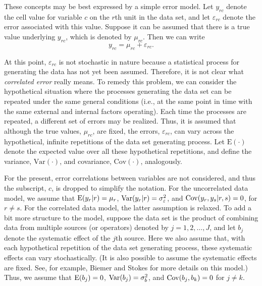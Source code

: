 \documentclass[]{krantz}
\begin{document}
These concepts may be best expressed by a simple error model. Let
\(y_{rc}\) denote the cell value for variable \(c\) on the \(r\)th unit
in the data set, and let \(\varepsilon_{rc}\) denote the error
associated with this value. Suppose it can be assumed that there is a
true value underlying \(y_{rc}\), which is denoted by \(\mu_{rc}\). Then
we can write \[\label{eq:10-1.1}
y_{rc} = \mu_{rc} + \varepsilon_{rc}.\]

At this point, \(\varepsilon_{rc}\) is not stochastic in nature because
a statistical process for generating the data has not yet been assumed.
Therefore, it is not clear what \emph{correlated error} really means. To
remedy this problem, we can consider the hypothetical situation where
the processes generating the data set can be repeated under the same
general conditions (i.e., at the same point in time with the same
external and internal factors operating). Each time the processes are
repeated, a different set of errors may be realized. Thus, it is assumed
that although the true values, \(\mu_{rc}\), are fixed, the errors,
\(\varepsilon_{rc}\), can vary across the hypothetical, infinite
repetitions of the data set generating process. Let \(\mbox{E}(\cdot)\)
denote the expected value over all these hypothetical repetitions, and
define the variance, \(\mathrm{Var}(\cdot)\), and covariance,
\(\mathrm{Cov}(\cdot)\), analogously.

For the present, error correlations between variables are not
considered, and thus the subscript, \(c\), is dropped to simplify the
notation. For the uncorrelated data model, we assume that
\({\rm E}(y_r \vert r) = \mu_r\),
\({\rm Var}(y_r \vert r) = \sigma_\varepsilon^2\), and
\({\rm Cov}(y_r ,y_s \vert r,s) = 0\), for \(r \ne s\). For the
correlated data model, the latter assumption is relaxed. To add a bit
more structure to the model, suppose the data set is the product of
combining data from multiple sources (or operators) denoted by
\(j = 1, 2, \ldots, J\), and let \(b_j\) denote the systematic effect of
the \(j\)th source. Here we also assume that, with each hypothetical
repetition of the data set generating process, these systematic effects
can vary stochastically. (It is also possible to assume the systematic
effects are fixed. See, for example, Biemer and Stokes
\citeyearpar{BiemerStokes1991} for more details on this model.) Thus, we
assume that \({\rm E}(b_j ) = 0\), \({\rm Var}(b_j ) = \sigma_b^2\), and
\({\rm Cov}(b_j ,b_k ) = 0\) for \(j \ne k\).
\end{document}
